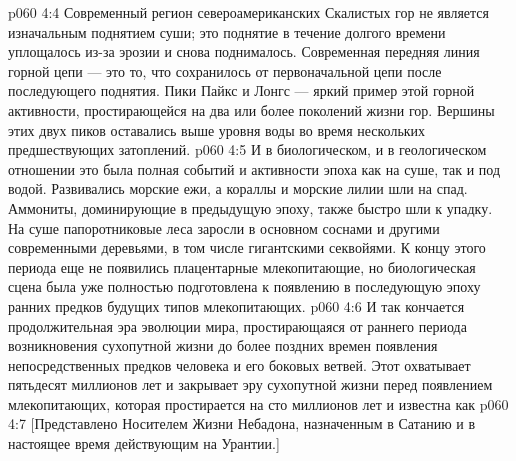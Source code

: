 \vs p060 4:4 Современный регион североамериканских Скалистых гор не является изначальным поднятием суши; это поднятие в течение долгого времени уплощалось из\hyp{}за эрозии и снова поднималось. Современная передняя линия горной цепи --- это то, что сохранилось от первоначальной цепи после последующего поднятия. Пики Пайкс и Лонгс --- яркий пример этой горной активности, простирающейся на два или более поколений жизни гор. Вершины этих двух пиков оставались выше уровня воды во время нескольких предшествующих затоплений.
\vs p060 4:5 И в биологическом, и в геологическом отношении это была полная событий и активности эпоха как на суше, так и под водой. Развивались морские ежи, а кораллы и морские лилии шли на спад. Аммониты, доминирующие в предыдущую эпоху, также быстро шли к упадку. На суше папоротниковые леса заросли в основном соснами и другими современными деревьями, в том числе гигантскими секвойями. К концу этого периода еще не появились плацентарные млекопитающие, но биологическая сцена была уже полностью подготовлена к появлению в последующую эпоху ранних предков будущих типов млекопитающих.
\vs p060 4:6 \pc И так кончается продолжительная эра эволюции мира, простирающаяся от раннего периода возникновения сухопутной жизни до более поздних времен появления непосредственных предков человека и его боковых ветвей. Этот  охватывает пятьдесят миллионов лет и закрывает эру сухопутной жизни перед появлением млекопитающих, которая простирается на сто миллионов лет и известна как 
\vsetoff
\vs p060 4:7 [Представлено Носителем Жизни Небадона, назначенным в Сатанию и в настоящее время действующим на Урантии.]
